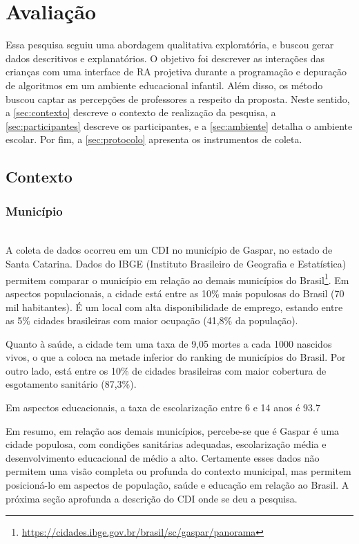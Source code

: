 \chapter{Avaliação}
\label{c_avaliacao}
Essa pesquisa seguiu uma abordagem qualitativa exploratória, e buscou gerar dados descritivos e explanatórios. O objetivo foi descrever as interações das crianças com uma interface de RA projetiva durante a programação e depuração de algoritmos em um ambiente educacional infantil. Além disso, os método buscou captar as percepções de professores a respeito da proposta. Neste sentido, a \autoref{sec:contexto} descreve o contexto de realização da pesquisa, a \autoref{sec:participantes} descreve os participantes, e a \autoref{sec:ambiente} detalha o ambiente escolar. Por fim, a \autoref{sec:protocolo} apresenta os instrumentos de coleta.
 
\section{Contexto}
\label{sec:contexto}
\subsection{Município}\\
A coleta de dados ocorreu em um \ac{CDI} no município de Gaspar, no estado de Santa Catarina. Dados do IBGE (Instituto Brasileiro de Geografia e Estatística) permitem comparar o município em relação ao demais municípios do Brasil\footnote{\url{https://cidades.ibge.gov.br/brasil/sc/gaspar/panorama}}. Em aspectos populacionais, a cidade está entre as 10\% mais populosas do Brasil (70 mil habitantes). É um local com alta disponibilidade de emprego, estando entre as 5\% cidades brasileiras com maior ocupação (41,8\% da população).
 
Quanto à saúde, a cidade tem uma taxa de 9,05 mortes a cada 1000 nascidos vivos, o que a coloca na metade inferior do ranking de municípios do Brasil. Por outro lado, está entre os 10\% de cidades brasileiras com maior cobertura de esgotamento sanitário (87,3\%).
 
Em aspectos educacionais, a taxa de escolarização entre 6 e 14 anos é 93.7%
 
Em resumo, em relação aos demais municípios, percebe-se que é Gaspar é uma cidade populosa, com condições sanitárias adequadas, escolarização média e desenvolvimento educacional de médio a alto. Certamente esses dados não permitem uma visão completa ou profunda do contexto municipal, mas permitem posicioná-lo em aspectos de população, saúde e educação em relação ao Brasil. A próxima seção aprofunda a descrição do CDI onde se deu a pesquisa.
 
